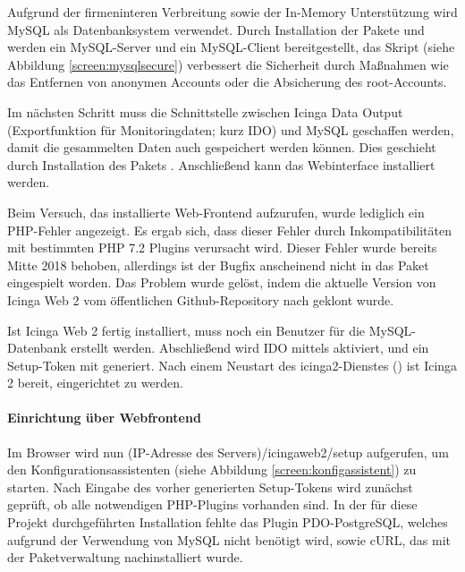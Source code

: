 Aufgrund der firmeninteren Verbreitung sowie der In-Memory Unterstützung wird MySQL als Datenbanksystem verwendet. Durch Installation der Pakete  und  werden ein MySQL-Server und ein MySQL-Client bereitgestellt, das Skript  (siehe Abbildung \ref{screen:mysqlsecure}) verbessert die Sicherheit durch Maßnahmen wie das Entfernen von anonymen Accounts oder die Absicherung des root-Accounts.

Im nächsten Schritt muss die Schnittstelle zwischen \glqq{}Icinga Data Output\grqq{} (Exportfunktion für Monitoringdaten; kurz IDO) und MySQL geschaffen werden, damit die gesammelten Daten auch gespeichert werden können. Dies geschieht durch Installation des Pakets . Anschließend kann das Webinterface  installiert werden.

Beim Versuch, das installierte Web-Frontend aufzurufen, wurde lediglich ein PHP-Fehler angezeigt. Es ergab sich, dass dieser Fehler durch Inkompatibilitäten mit bestimmten PHP 7.2 Plugins verursacht wird. Dieser Fehler wurde bereits Mitte 2018 behoben, allerdings ist der Bugfix anscheinend nicht in das Paket eingespielt worden. Das Problem wurde gelöst, indem die aktuelle Version von \glqq{}Icinga Web 2\grqq{} vom öffentlichen Github-Repository nach  geklont wurde.

Ist \glqq{}Icinga Web 2\grqq{} fertig installiert, muss noch ein Benutzer für die MySQL-Datenbank erstellt werden. Abschließend wird IDO mittels  aktiviert, und ein Setup-Token mit  generiert. Nach einem Neustart des icinga2-Dienstes () ist \glqq{}Icinga 2\grqq{} bereit, eingerichtet zu werden.

\paragraph{Einrichtung über Webfrontend}
Im Browser wird nun (IP-Adresse des Servers)/icingaweb2/setup aufgerufen, um den Konfigurationsassistenten (siehe Abbildung \ref{screen:konfigassistent}) zu starten. Nach Eingabe des vorher generierten Setup-Tokens wird zunächst geprüft, ob alle notwendigen PHP-Plugins vorhanden sind. In der für diese Projekt durchgeführten Installation fehlte das Plugin \glqq{}PDO-PostgreSQL\grqq{}, welches aufgrund der Verwendung von MySQL nicht benötigt wird, sowie \glqq{}cURL\grqq{}, das mit der Paketverwaltung nachinstalliert wurde.

